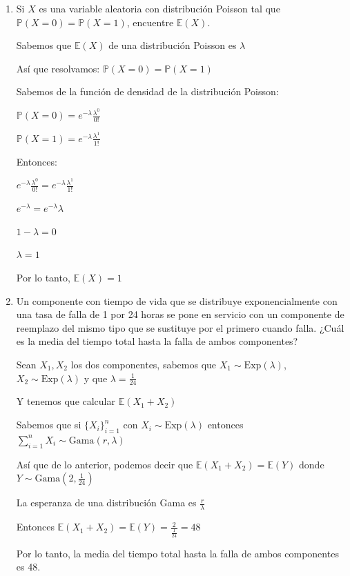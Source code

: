 \documentclass[11pt,a4paper]{report}
\begin{document}
\begin{enumerate}
{		}

		\item{
			Si $X$ es una variable aleatoria con distribución Poisson tal que
			$\mathbb{P}(X = 0) = \mathbb{P}(X = 1)$, encuentre $\mathbb{E}(X)$.

			Sabemos que $\mathbb{E}(X)$ de una distribución Poisson es $\lambda$

			Así que resolvamos: $\mathbb{P}(X = 0) = \mathbb{P}(X = 1)$

			Sabemos de la función de densidad de la distribución Poisson:

			$\mathbb{P}(X = 0) = e^{-\lambda} \frac{\lambda^{0}}{0!}$

			$\mathbb{P}(X = 1) = e^{-\lambda} \frac{\lambda^{1}}{1!}$


			Entonces:

			$e^{-\lambda} \frac{\lambda^{0}}{0!} = e^{-\lambda} \frac{\lambda^{1}}{1!}$

			$e^{-\lambda}  =  e^{-\lambda} \lambda$

			$1 - \lambda =  0$

			$\lambda = 1$

			Por lo tanto, $ \mathbb{E}(X) = 1$\\
		}

		\item{
			Un componente con tiempo de vida que se distribuye exponencialmente
			con una tasa de falla de 1 por 24 horas se pone en servicio con un
			componente de reemplazo del mismo tipo que se sustituye por el
			primero cuando falla. ¿Cuál es la media del tiempo total hasta la
			falla de ambos componentes?

			Sean $X_{1}, X_{2}$ los dos componentes, sabemos que $X_{1} \sim \text{Exp}(\lambda)$, $X_{2} \sim \text{Exp}(\lambda)$  y que $\lambda = \frac{1}{24}$

			Y tenemos que calcular $\mathbb{E}(X_{1} + X_{2})$

			Sabemos que si $\{X_i\}_{i=1}^{n}$ con $X_{i} \sim \text{Exp}(\lambda)$ entonces $\sum_{i=1}^{n}  X_{i} \sim \text{Gama}(r, \lambda) $

			Así que de lo anterior, podemos decir que  $\mathbb{E}(X_{1} + X_{2}) = \mathbb{E}(Y)$ donde $Y \sim \text{Gama}(2, \frac{1}{24})$

			La esperanza de una distribución Gama es $\frac{r}{\lambda}$

			Entonces $\mathbb{E}(X_{1} + X_{2}) = \mathbb{E}(Y) = \frac{2}{\frac{1}{24}} = 48$

			Por lo tanto, la media del tiempo total hasta la
			falla de ambos componentes es 48.\\
		}


\end{enumerate}
\end{document}
